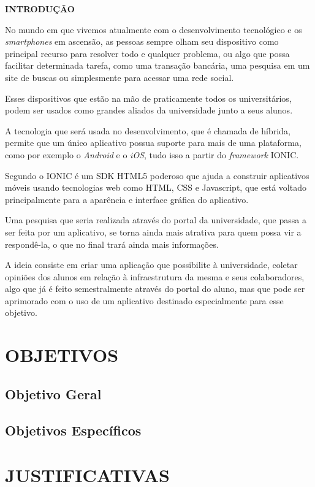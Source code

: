 \vspace{1.2em}
\textbf{\large INTRODUÇÃO}

\vspace{2.9em}
\thispagestyle{empty}


\par No mundo em que vivemos atualmente com o desenvolvimento tecnológico e os \textit{smartphones} em ascensão, as pessoas sempre olham seu dispositivo como principal recurso para resolver todo e qualquer problema, ou algo que possa facilitar determinada tarefa, como uma transação bancária, uma pesquisa em um site de buscas ou simplesmente para acessar uma rede social.
\par Esses dispositivos que estão na mão de praticamente todos os universitários, podem ser usados como grandes aliados da universidade junto a seus alunos.
\par A tecnologia que será usada no desenvolvimento, que é chamada de híbrida, permite que um único aplicativo possua suporte para mais de uma plataforma, como por exemplo o \textit{Android} e o \textit{iOS}, tudo isso a partir do \textit{framework} IONIC.
\par Segundo  o IONIC é um SDK HTML5 poderoso que ajuda a construir aplicativos móveis usando tecnologias web como HTML, CSS e Javascript, que está voltado principalmente para a aparência e interface gráfica do aplicativo.
\par Uma pesquisa que seria realizada através do portal da universidade, que passa a ser feita por um aplicativo, se torna ainda mais atrativa para quem possa vir a respondê-la, o que no final trará ainda mais informações.
\par A ideia consiste em criar uma aplicação que possibilite à universidade, coletar opiniões dos alunos em relação à infraestrutura da mesma e seus colaboradores, algo que já é feito semestralmente através do portal do aluno, mas que pode ser aprimorado com o uso de um aplicativo destinado especialmente para esse objetivo.


\chapter{OBJETIVOS}


\section{Objetivo Geral}


\section{Objetivos Específicos}

\chapter{JUSTIFICATIVAS}

